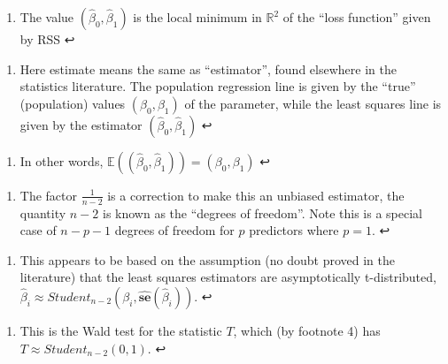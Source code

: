 \documentclass[11pt]{article}
\providecommand{\tightlist}{%
      \setlength{\itemsep}{0pt}\setlength{\parskip}{0pt}}
\begin{document}
    \hypertarget{foot7}{}
\begin{enumerate}
\def\labelenumi{\arabic{enumi}.}
\setcounter{enumi}{6}
\tightlist
\item
  The value \((\hat{\beta}_0, \hat{\beta}_1)\) is the local minimum in
  \(\mathbb{R}^2\) of the ``loss function'' given by RSS ↩
\end{enumerate}

\hypertarget{foot8}{}
\begin{enumerate}
\def\labelenumi{\arabic{enumi}.}
\setcounter{enumi}{7}
\tightlist
\item
  Here estimate means the same as ``estimator'', found elsewhere in the
  statistics literature. The population regression line is given by the
  ``true'' (population) values \((\beta_0, \beta_1)\) of the parameter,
  while the least squares line is given by the estimator
  \((\hat{\beta}_0, \hat{\beta}_1)\) ↩
\end{enumerate}

\hypertarget{foot9}{}
\begin{enumerate}
\def\labelenumi{\arabic{enumi}.}
\setcounter{enumi}{8}
\tightlist
\item
  In other words,
  \(\mathbb{E}\left((\hat{\beta}_0, \hat{\beta}_1)\right) = (\beta_0, \beta_1)\)
  ↩
\end{enumerate}

\hypertarget{foot10}{}
\begin{enumerate}
\def\labelenumi{\arabic{enumi}.}
\setcounter{enumi}{9}
\tightlist
\item
  The factor \(\frac{1}{n-2}\) is a correction to make this an unbiased
  estimator, the quantity \(n - 2\) is known as the ``degrees of
  freedom''. Note this is a special case of \(n - p - 1\) degrees of
  freedom for \(p\) predictors where \(p = 1\). ↩
\end{enumerate}

\hypertarget{foot11}{}
\begin{enumerate}
\def\labelenumi{\arabic{enumi}.}
\setcounter{enumi}{10}
\tightlist
\item
  This appears to be based on the assumption (no doubt proved in the
  literature) that the least squares estimators are asymptotically
  t-distributed,
  \(\hat{\beta}_i \approx Student_{n-2}(\beta_i, \hat{\mathbf{se}}(\hat{\beta}_i))\).
  ↩
\end{enumerate}

\hypertarget{foot12}{}
\begin{enumerate}
\def\labelenumi{\arabic{enumi}.}
\setcounter{enumi}{11}
\tightlist
\item
  This is the Wald test for the statistic \(T\), which (by footnote 4)
  has \(T \approx Student_{n - 2}(0, 1)\). ↩
\end{enumerate}
\end{document}
